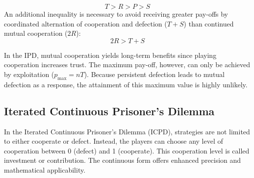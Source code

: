 \documentclass[11pt]{article}
\begin{document}
\begin{equation}
T > R > P > S
\end{equation}
An additional inequality is necessary to avoid receiving greater pay-offs by coordinated alternation of cooperation and defection ($T + S$) than continued mutual cooperation ($2 R$):
\begin{equation}\label{eq:AvGrPa}
2R > T + S
\end{equation}

\noindent
In the IPD, mutual cooperation yields long-term benefits since playing cooperation increases trust.
The maximum pay-off, however, can only be achieved by exploitation ($p_{\mathrm{max}} = n T$).
Because persistent defection leads to mutual defection as a response, the attainment of this maximum value is highly unlikely.

%
\subsection{Iterated Continuous Prisoner's Dilemma} \label{sec:iterated_continuous_prisoners_dilemma}

In the Iterated Continuous Prisoner's Dilemma (ICPD), strategies are not limited to either cooperate or defect.
Instead, the players can choose any level of cooperation between 0 (defect) and 1 (cooperate).
This cooperation level is called investment or contribution.
The continuous form offers enhanced precision and mathematical applicability.
%
\end{document}
